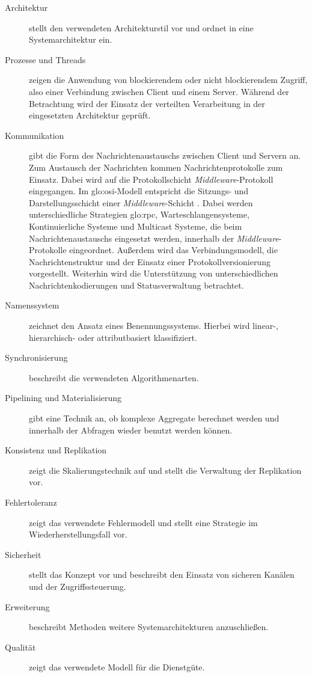 \begin{description}
	\item[Architektur] stellt den verwendeten Architekturstil vor und ordnet in eine Systemarchitektur ein.
	\item[Prozesse und Threads] zeigen die Anwendung von blockierendem oder nicht blockierendem Zugriff, also einer Verbindung zwischen Client und einem Server. Während der Betrachtung wird der Einsatz der verteilten Verarbeitung in der eingesetzten Architektur geprüft.
	\item[Kommunikation] gibt die Form des Nachrichtenaustauschs zwischen Client und Servern an. Zum Austausch der Nachrichten kommen Nachrichtenprotokolle zum Einsatz. Dabei wird auf die Protokollschicht \textit{Middleware}-Protokoll eingegangen. Im \acrshort{glo:osi}-Modell entspricht die Sitzungs- und Darstellungsschicht einer \textit{Middleware}-Schicht . Dabei werden unterschiedliche Strategien \gls{glo:rpc}, Warteschlangensysteme, Kontinuierliche Systeme und Multicast Systeme, die beim Nachrichtenaustauschs eingesetzt werden, innerhalb der \textit{Middleware}-Protokolle eingeordnet. Außerdem wird das Verbindungsmodell, die Nachrichtenstruktur und der Einsatz einer Protokollversionierung vorgestellt. Weiterhin wird die Unterstützung von unterschiedlichen Nachrichtenkodierungen und Statusverwaltung betrachtet.
	\item[Namenssystem] zeichnet den Ansatz eines Benennungssystems. Hierbei wird linear-, hierarchisch- oder attributbasiert klassifiziert.
	\item[Synchronisierung] beschreibt die verwendeten Algorithmenarten. 
	\item[Pipelining und Materialisierung] gibt eine Technik an, ob komplexe Aggregate berechnet werden und innerhalb der Abfragen wieder benutzt werden können.
	\item[Konsistenz und Replikation] zeigt die Skalierungstechnik auf und stellt die Verwaltung der Replikation vor. 	
	\item[Fehlertoleranz] zeigt das verwendete Fehlermodell und stellt eine Strategie im Wiederherstellungsfall vor.
	\item[Sicherheit] stellt das Konzept vor und beschreibt den Einsatz von sicheren Kanälen und der Zugriffssteuerung.	
	\item[Erweiterung] beschreibt Methoden weitere Systemarchitekturen anzuschließen.
	\item[Qualität] zeigt das verwendete Modell für die Dienstgüte.
\end{description}

